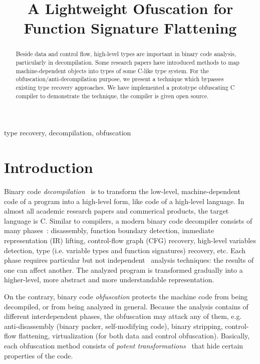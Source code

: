 \documentclass[compsoc,conference,a4paper,10pt,times]{IEEEtran}
\begin{document}
\title{A Lightweight Ofuscation for Function Signature Flattening}

\author{
}

\maketitle

\begin{abstract}
  Beside data and control flow, high-level types are important in binary code analysis, particularly in
  decompilation. Some research papers have introduced methods to map machine-dependent objects into types
  of some C-like type system. For the obfuscation/anti-decompilation purpose, we
  present a technique which bypasses existing type recovery approaches. We have implemented a
  prototype obfuscating C compiler to demonstrate the technique, the compiler is
  given open source.
\end{abstract}

\begin{IEEEkeywords}
type recovery, decompilation, obfuscation
\end{IEEEkeywords}

\section{Introduction}
\noindent
Binary code \emph{decompilation}~\cite{cifuentes_reverse_1994} is to transform the low-level,
machine-dependent code of a program into a high-level form, like code of a high-level language.
In almost all academic research papers and commerical products, the target language is C.
Similar to compilers, a modern binary code decompiler consists of many
phases~\cite{cifuentes_reverse_1994,van_emmerik_static_2007}: disassembly, function boundary detection, immediate
representation (IR) lifting, control-flow graph (CFG) recovery, high-level variables detection,
type (i.e. variable types and function signatures) recovery, etc. Each phase requires
particular but not independent~\cite{schwarz_disassembly_2002} analysis techniques: the results of
one can affect another. The analyzed program is
transformed gradually into a higher-level, more abstract and more understandable representation.

On the contrary, binary code \emph{obfuscation} protects the machine code from
being decompiled, or from being analyzed in general. Because the analysis contains of different
interdependent phases, the obfuscation may attack any of them, e.g. anti-disassembly
(binary packer, self-modifying code), binary stripping, control-flow flattening, virtualization (for both
data and control obfuscation). Basically, each obfuscation method consists of
\emph{potent transformations}~\cite{collberg_taxonomy_1997,dalla_preda_semantic-based_2005}
that hide certain properties of the code.
\end{document}
